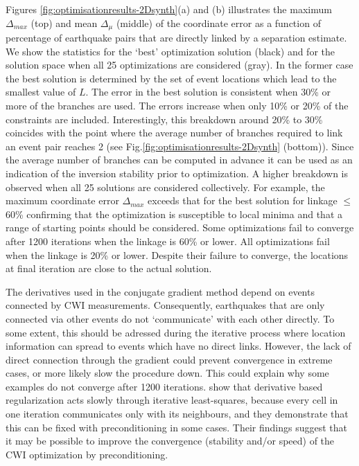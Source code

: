 \documentclass[extra, onecolumn, doublespacing]{gji}
\begin{document}
Figures \ref{fig:optimisationresults-2Dsynth}(a) and (b) illustrates
the maximum $\Delta_{max}$ (top) and mean $\Delta_\mu$ (middle) of
the coordinate error as a function of percentage of earthquake pairs
that are directly linked by a separation estimate. We show the
statistics for the `best' optimization solution (black) and for the
solution space when all 25 optimizations are considered (gray). In
the former case the best solution is determined by the set of event
locations which lead to the smallest value of $L$. The error in the
best solution is consistent when 30\% or more of the branches are
used. The errors increase when only 10\% or 20\% of the constraints
are included. Interestingly, this breakdown around 20\% to 30\%
coincides with the point where the average number of branches
required to link an event pair reaches 2 (see
Fig.\ref{fig:optimisationresults-2Dsynth} (bottom)). Since the
average number of branches can be computed in advance it can be used
as an indication of the inversion stability prior to optimization. A
higher breakdown is observed when all 25 solutions are considered
collectively. For example, the maximum coordinate error
$\Delta_{max}$ exceeds that for the best solution for linkage
$\leq$60\% confirming that the optimization is susceptible to local
minima and that a range of starting points should be considered.
Some optimizations fail to converge after 1200 iterations when the
linkage is 60\% or lower. All optimizations fail when the linkage is
20\% or lower. Despite their failure to converge, the locations at
final iteration are close to the actual solution.

The derivatives used in the conjugate gradient method depend on
events connected by CWI measurements. Consequently, earthquakes that
are only connected via other events do not `communicate' with each
other directly. To some extent, this should be adressed during the
iterative process where location information can spread to events
which have no direct links. However, the lack of direct connection
through the gradient could prevent convergence in extreme cases, or
more likely slow the procedure down. This could explain why some
examples do not converge after 1200 iterations.
\citet{dr_VanDecar94a} show that derivative based regularization acts slowly
through iterative least-squares, because
 every cell in one iteration communicates only with its neighbours, and they demonstrate that this can be
fixed with preconditioning in some cases. Their findings suggest
that it may be possible to improve the convergence (stability and/or
speed) of the CWI optimization by preconditioning.
\end{document}
